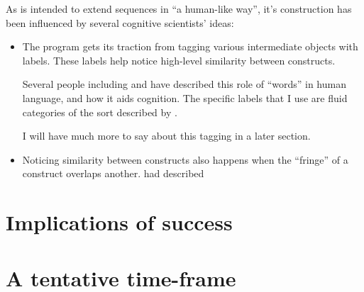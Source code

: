 \documentclass{article}
\begin{document}
As \seq is intended to extend sequences in ``a human-like way'', it's construction has been influenced by several cognitive scientists' ideas:

\begin{itemize}
\item The program gets its traction from tagging various intermediate objects with labels. These labels help \seq notice high-level similarity between constructs.

Several people including \dan and \andy have described this role of ``words'' in human language, and how it aids cognition. The specific labels that I use are fluid categories of the sort described by \hof.

I will have much more to say about this tagging in a later section.

\item Noticing similarity between constructs also happens when the ``fringe'' of a construct overlaps another. \cite{James} had described 
\end{itemize}




\section{Implications of success}
\section{A tentative time-frame}


\printindex
\end{document}
